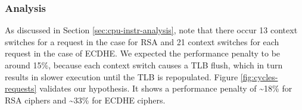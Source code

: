 \documentclass[../../../main.tex]{subfiles}
\begin{document}
\subsubsection*{Analysis}
As discussed in Section \ref{sec:cpu-instr-analysis}, note that there
occur 13 context switches for a request in the case for RSA and 21
context switches for each request in the case of ECDHE. We expected
the performance penalty to be around 15\%, because each context switch
causes a TLB flush, which in turn results in slower execution until
the TLB is repopulated. Figure \ref{fig:cycles-requests} validates our
hypothesis. It shows a performance penalty of \textasciitilde18\% for
RSA ciphers and \textasciitilde33\% for ECDHE ciphers.

\end{document}
